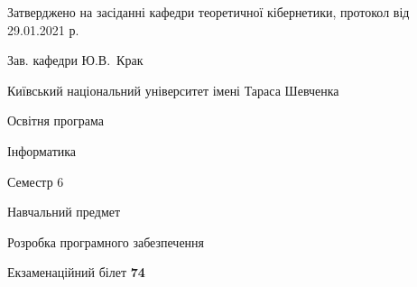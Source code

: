 \documentclass[10pt, ukrainian]{article}
\begin{document}
{\vspace{5mm}\smallskip \begin {small} Затверджено на засіданні кафедри теоретичної кібернетики, протокол  від   29.01.2021 р.\par\smallskip\smallskip
{\parbox {6.5 cm}{Зав. кафедри \dotfill Ю.В.~Крак}} \end{small}}
\newpage

{{\begin {small}\par
{ \center  Київський національний університет імені Тараса Шевченка \par}
{\parbox {5 cm}{Освітня програма \hfill}{\parbox {7 cm}{Інформатика \hfill}}\parbox {6 cm}{\hfill Семестр 6}}\par
{\parbox {5 cm} {Навчальний предмет \hfill}\parbox {7 cm}{Розробка програмного забезпечення \hfill}\parbox {6cm}{\hfill}\par}\vspace{-7pt} \end{small}}{\center Екзаменаційний білет \No \textbf
{ 74 }\par}}
\end{document}
